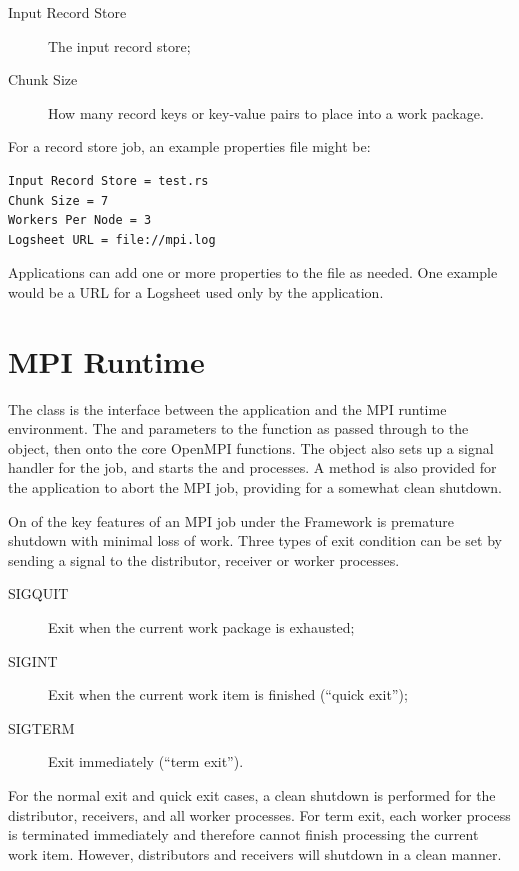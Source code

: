 \begin{description}
\item[Input Record Store] The input record store;
\item[Chunk Size] How many record keys or key-value pairs to place into a
work package.
\end{description}

For a record store job, an example properties file might be:
\begin{verbatim}
Input Record Store = test.rs
Chunk Size = 7
Workers Per Node = 3
Logsheet URL = file://mpi.log
\end{verbatim}

Applications can add one or more properties to the file as needed. One example
would be a URL for a Logsheet used only by the application.

\section{MPI Runtime}
\label{sec-mpiruntime}

The  class is the interface between the application and the
MPI runtime environment. The  and  parameters
to the  function as passed through to the 
object, then onto the core OpenMPI functions. The  object 
also sets up a signal handler for the job, and starts the 
and  processes.  A method is also provided for the application
to abort the MPI job, providing for a somewhat clean shutdown.

On of the key features of an MPI job under the Framework is premature shutdown
with minimal loss of work. Three types of exit condition can be set by sending
a signal to the distributor, receiver or worker processes. 

\begin{description}
\item[SIGQUIT] Exit when the current work package is exhausted;
\item[SIGINT] Exit when the current work item is finished (``quick exit'');
\item[SIGTERM] Exit immediately (``term exit'').
\end{description}

For the normal exit and quick exit cases, a clean shutdown is performed for
the distributor, receivers, and all worker processes. For term exit, each
worker process is terminated immediately and therefore cannot finish processing
the current work item. However, distributors and receivers will shutdown in a
clean manner.

